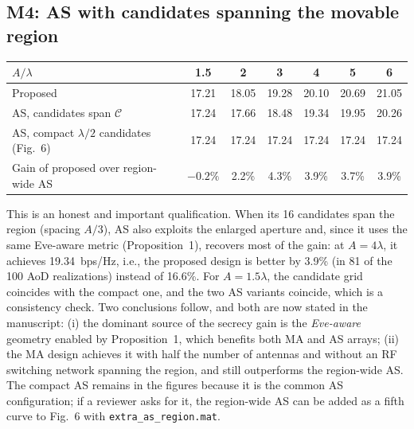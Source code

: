 \documentclass[10pt,a4paper]{article}
\newcommand{\code}[1]{\texttt{#1}}
\begin{document}
\subsection{M4: AS with candidates spanning the movable region}\label{sec:m4}
\begin{center}\small
\begin{tabular}{lcccccc}
\toprule
$A/\lambda$ & 1.5 & 2 & 3 & 4 & 5 & 6 \\ \midrule
Proposed & 17.21 & 18.05 & 19.28 & 20.10 & 20.69 & 21.05 \\
AS, candidates span $\mathcal C$ & 17.24 & 17.66 & 18.48 & 19.34 & 19.95 & 20.26 \\
AS, compact $\lambda/2$ candidates (Fig.~6) & 17.24 & 17.24 & 17.24 & 17.24 & 17.24 & 17.24 \\
Gain of proposed over region-wide AS & $-0.2\%$ & 2.2\% & 4.3\% & 3.9\% & 3.7\% & 3.9\% \\
\bottomrule
\end{tabular}
\end{center}
This is an honest and important qualification. When its 16 candidates span the region (spacing $A/3$), AS also exploits the enlarged aperture and, since it uses the same Eve-aware metric (Proposition~1), recovers most of the gain: at $A=4\lambda$, it achieves 19.34~bps/Hz, i.e., the proposed design is better by 3.9\% (in 81 of the 100 AoD realizations) instead of 16.6\%. For $A=1.5\lambda$, the candidate grid coincides with the compact one, and the two AS variants coincide, which is a consistency check. Two conclusions follow, and both are now stated in the manuscript: (i) the dominant source of the secrecy gain is the \emph{Eve-aware} geometry enabled by Proposition~1, which benefits both MA and AS arrays; (ii) the MA design achieves it with half the number of antennas and without an RF switching network spanning the region, and still outperforms the region-wide AS. The compact AS remains in the figures because it is the common AS configuration; if a reviewer asks for it, the region-wide AS can be added as a fifth curve to Fig.~6 with \code{extra\_as\_region.mat}.
\end{document}
